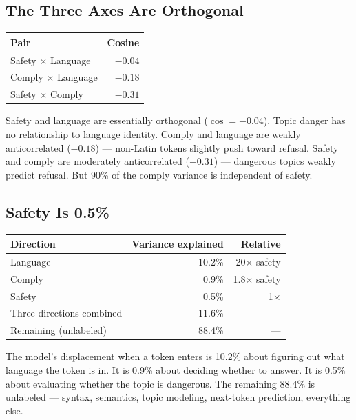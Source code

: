 \documentclass[11pt,a4paper]{article}
\begin{document}
\subsection{The Three Axes Are Orthogonal}

\begin{center}
\begin{tabular}{lr}
\toprule
\textbf{Pair} & \textbf{Cosine} \\
\midrule
Safety $\times$ Language & $-0.04$ \\
Comply $\times$ Language & $-0.18$ \\
Safety $\times$ Comply & $-0.31$ \\
\bottomrule
\end{tabular}
\end{center}

Safety and language are essentially orthogonal ($\cos = -0.04$). Topic danger has no relationship to language identity. Comply and language are weakly anticorrelated ($-0.18$) --- non-Latin tokens slightly push toward refusal. Safety and comply are moderately anticorrelated ($-0.31$) --- dangerous topics weakly predict refusal. But 90\% of the comply variance is independent of safety.

\subsection{Safety Is 0.5\%}

\begin{center}
\begin{tabular}{lrr}
\toprule
\textbf{Direction} & \textbf{Variance explained} & \textbf{Relative} \\
\midrule
Language & 10.2\% & 20$\times$ safety \\
Comply & 0.9\% & 1.8$\times$ safety \\
Safety & 0.5\% & 1$\times$ \\
\midrule
Three directions combined & 11.6\% & --- \\
Remaining (unlabeled) & 88.4\% & --- \\
\bottomrule
\end{tabular}
\end{center}

The model's displacement when a token enters is 10.2\% about figuring out what language the token is in. It is 0.9\% about deciding whether to answer. It is 0.5\% about evaluating whether the topic is dangerous. The remaining 88.4\% is unlabeled --- syntax, semantics, topic modeling, next-token prediction, everything else.
\end{document}
